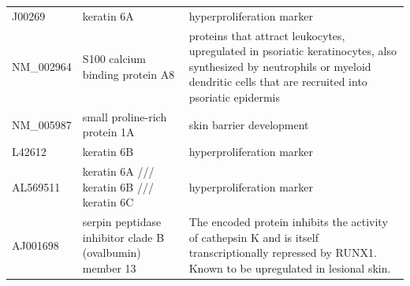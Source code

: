 \documentclass[10pt,a4paper]{report}
\begin{document}
\begin{table}[]
\begin{tabular}{l|p{4.5cm} p{8.5cm}}
			J00269             & keratin 6A                                                                                                              & hyperproliferation marker\cite{jiang2015biomarkers}                                                                                                                                                                                                                 \\
			NM\_002964         & S100 calcium binding protein A8                                                                                         & proteins that attract leukocytes, upregulated in psoriatic keratinocytes, also synthesized by neutrophils or myeloid dendritic cells that are recruited into psoriatic epidermis\cite{roberson2010psoriasis}                                                          \\
			NM\_005987         & small proline-rich protein 1A                                                                                           & skin barrier development\cite{bergboer2012genetics}                                                                                                                                                                                                                    \\
			L42612             & keratin 6B                                                                                                              & hyperproliferation marker\cite{jiang2015biomarkers}                                                                                                                                                                                                                  \\
			AL569511           & keratin 6A /// keratin 6B /// keratin 6C                                                                                & hyperproliferation marker\cite{jiang2015biomarkers}                                                                                                                                                                                                                  \\
			AJ001698           & serpin peptidase inhibitor  clade B (ovalbumin) member 13                                                               & The encoded protein inhibits the activity of cathepsin K and is itself transcriptionally repressed by RUNX1. Known to be upregulated in lesional skin.\cite{suarez2012expanding}                                                                                    \\

\end{tabular}
\end{table}
\end{document}
